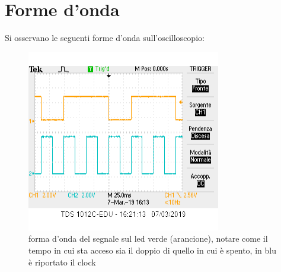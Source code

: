 \documentclass[10pt,a4paper]{article}
\begin{document}
\newpage



\section{Forme d'onda}
Si osservano le seguenti forme d'onda sull'oscilloscopio:
\begin{figure}\centering
	\includegraphics[scale=0.9]{green.png}
	\caption{forma d'onda del segnale sul led verde (arancione), notare come il tempo in cui sta acceso sia il doppio di quello in cui è spento, in blu è riportato il clock}
	
\end{figure}
\end{document}
